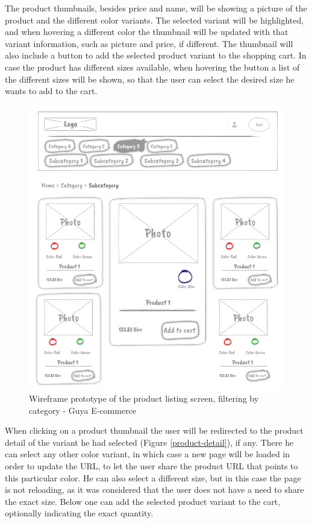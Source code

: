 The product thumbnails, besides price and name, will be showing a picture of the product and the different color variants. The selected variant will be highlighted, and when hovering a different color the thumbnail will be updated with that variant information, such as picture and price, if different. The thumbnail will also include a button to add the selected product variant to the shopping cart. In case the product has different sizes available, when hovering the button a list of the different sizes will be shown, so that the user can select the desired size he wants to add to the cart.

\begin{figure}[!h]
\center
\includegraphics[keepaspectratio, width=15cm]{wireframes/productlist.png}
\caption{Wireframe prototype of the product listing screen, filtering by category - Guya E-commerce}
\label{display-products}
\end{figure}

When clicking on a product thumbnail the user will be redirected to the product detail of the variant he had selected (Figure \ref{product-detail}), if any. There he can select any other color variant, in which case a new page will be loaded in order to update the URL, to let the user share the product URL that points to this particular color. He can also select a different size, but in this case the page is not reloading, as it was considered that the user does not have a need to share the exact size. Below one can add the selected product variant to the cart, optionally indicating the exact quantity.

